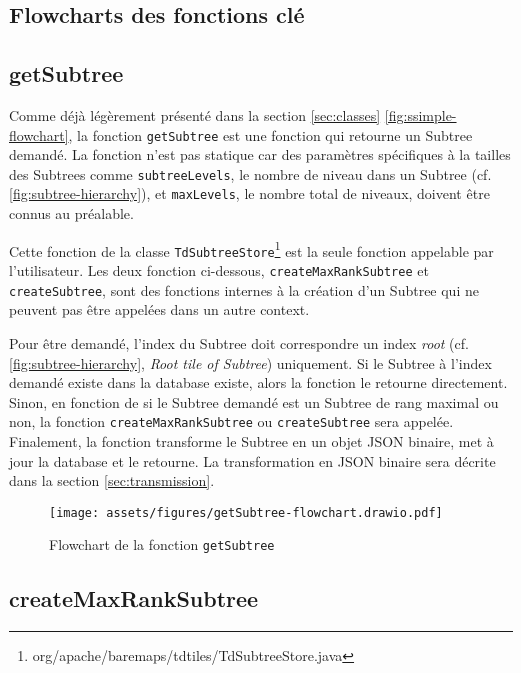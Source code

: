 \subsection{Flowcharts des fonctions clé}

\subsection*{getSubtree}

Comme déjà légèrement présenté dans la section \ref{sec:classes} \autoref{fig:ssimple-flowchart}, la fonction \texttt{getSubtree} est une fonction qui retourne un Subtree demandé. La fonction n'est pas statique car des paramètres spécifiques à la tailles des Subtrees comme \texttt{subtreeLevels}, le nombre de niveau dans un Subtree (cf. \autoref{fig:subtree-hierarchy}), et \texttt{maxLevels}, le nombre total de niveaux, doivent être connus au préalable.

Cette fonction de la classe \texttt{TdSubtreeStore}\footnote{org/apache/baremaps/tdtiles/TdSubtreeStore.java} est la seule fonction appelable par l'utilisateur. Les deux fonction ci-dessous, \texttt{createMaxRankSubtree} et \texttt{createSubtree}, sont des fonctions internes à la création d'un Subtree qui ne peuvent pas être appelées dans un autre context.

Pour être demandé, l'index du Subtree doit correspondre un index \textit{root} (cf. \autoref{fig:subtree-hierarchy}, \textit{Root tile of Subtree}) uniquement. Si le Subtree à l'index demandé existe dans la database existe, alors la fonction le retourne directement. Sinon, en fonction de si le Subtree demandé est un Subtree de rang maximal ou non, la fonction \texttt{createMaxRankSubtree} ou \texttt{createSubtree} sera appelée. Finalement, la fonction transforme le Subtree en un objet JSON binaire, met à jour la database et le retourne. La transformation en JSON binaire sera décrite dans la section \ref{sec:transmission}.

\begin{figure}[H]
    \centering
    \texttt{[image: assets/figures/getSubtree-flowchart.drawio.pdf]}
    \caption{Flowchart de la fonction \texttt{getSubtree}}
    \label{fig:getsubtree-flowchart}
\end{figure}

\newpage
\subsection*{createMaxRankSubtree}

